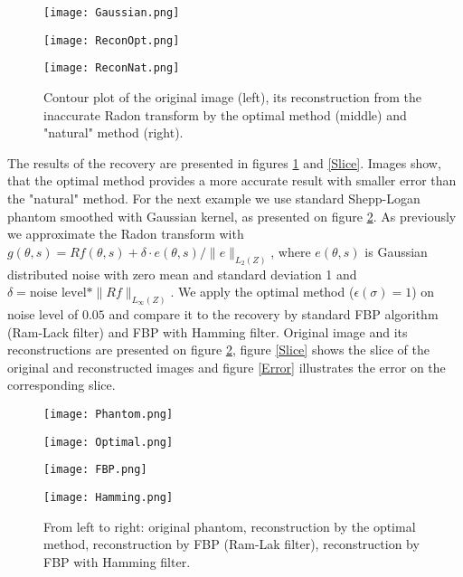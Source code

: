 \documentclass[12pt]{iopart}
\begin{document}
   \begin{figure}[H]    
        \begin{minipage}[t]{0.31\textwidth}
            \texttt{[image: Gaussian.png]}
        \end{minipage}
        \hspace{\fill}
        \begin{minipage}[t]{0.3\textwidth}
            \texttt{[image: ReconOpt.png]}
        \end{minipage}
        \hspace{\fill}
        \begin{minipage}[t]{0.3\textwidth}
            \texttt{[image: ReconNat.png]}
        \end{minipage}
        \caption{Contour plot of the original image (left), its reconstruction from the inaccurate Radon transform by the optimal method (middle) and "natural" method (right).}
        \label{Original}
    \end {figure}    
	
	The results of the recovery are presented in figures \ref{Original} and \ref{Slice}. Images show, that the optimal method provides a more accurate result with smaller error than the "natural" method.
	For the next example we use standard Shepp-Logan phantom smoothed with Gaussian kernel, as presented on figure \ref{Phantom}. As previously we approximate the Radon transform with $g(\theta,s) = Rf(\theta,s)+\delta\cdot e(\theta,s)/\|e\|_{L_2(Z)}$, where $e(\theta,s)$ is Gaussian distributed noise with zero mean and standard deviation 1 and $\delta=\mbox{noise level}*\|Rf\|_{L_\infty(Z)}$. We apply the optimal method ($\epsilon(\sigma) = 1$) on noise level of $0.05$ and compare it to the recovery by standard FBP algorithm (Ram-Lack filter) and FBP with Hamming filter. Original image and its reconstructions are presented on figure \ref{Phantom}, figure \ref{Slice} shows the slice of the original and reconstructed images and figure \ref{Error} illustrates the error on the corresponding slice.
	
	 \begin{figure}[H]    
        \begin{minipage}[t]{0.24\textwidth}
            \texttt{[image: Phantom.png]}
        \end{minipage}
        \begin{minipage}[t]{0.24\textwidth}
            \texttt{[image: Optimal.png]}
        \end{minipage}
        \begin{minipage}[t]{0.24\textwidth}
            \texttt{[image: FBP.png]}
        \end{minipage}
        \begin{minipage}[t]{0.24\textwidth}
            \texttt{[image: Hamming.png]}
        \end{minipage}
        \caption{From left to right: original phantom, reconstruction by the optimal method, reconstruction by FBP (Ram-Lak filter), reconstruction by FBP with Hamming filter.}
        \label{Phantom}
    \end {figure}    
    
\end{document}
